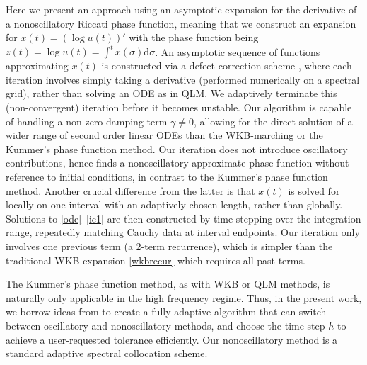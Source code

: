 \documentclass[10pt]{article}
\renewcommand{\d}{\mathrm{d}} %
\newcommand{\g}{\gamma}
\begin{document}
Here we present an approach using an asymptotic expansion for the derivative of
a nonoscillatory Riccati phase function, meaning that we construct an expansion
for $x(t) = (\log u(t))'$ with the phase function being $z(t) = \log u(t) =
\int^t x(\sigma)\d \sigma$.
An asymptotic sequence of functions approximating $x(t)$
is constructed
via a defect
correction scheme \cite{bohmer1984},
where each iteration involves simply taking a derivative
(performed numerically on a spectral grid), rather than solving
an ODE as in QLM.
We adaptively terminate this (non-convergent) iteration before it becomes unstable.
%
Our algorithm is capable of handling a non-zero damping term $\g \neq 0$,
allowing for the direct solution of a wider range of second order linear ODEs
than the WKB-marching or the Kummer's phase function method.
%
Our iteration does not introduce oscillatory contributions,
hence finds a nonoscillatory approximate phase function without
reference to initial conditions, in contrast to the
Kummer's phase function method. 
%
Another crucial difference from the latter is that $x(t)$ is solved for
locally on one interval with an adaptively-chosen length, rather than globally.
Solutions to \cref{ode}--\cref{ic1} are then constructed by time-stepping over the
integration range, repeatedly matching Cauchy data at interval endpoints.
%
Our iteration only involves one previous term (a 2-term recurrence),
which is simpler than the traditional WKB expansion
\cref{wkbrecur} which requires all past terms.
%
%

%
The Kummer's phase function method, as with WKB or QLM methods,
is naturally only applicable in the high frequency regime.
Thus, in the present work, we borrow ideas from \cite{agocs2020efficient} to
create a fully adaptive algorithm that can switch 
between oscillatory and nonoscillatory methods,
and choose the time-step $h$ to achieve a user-requested
tolerance efficiently.
Our nonoscillatory method is a standard adaptive spectral collocation scheme.
\end{document}
